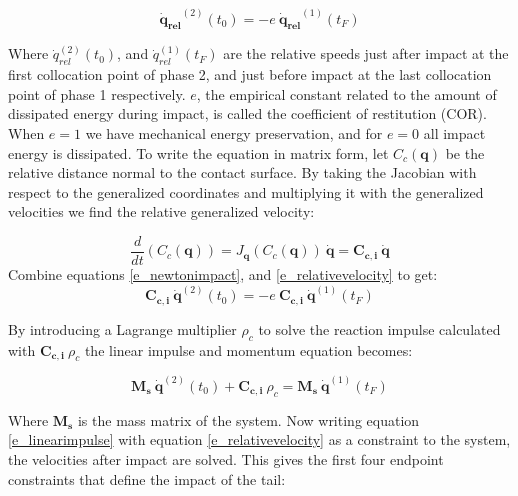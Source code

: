 \documentclass[default,iicol]{sn-jnl}
\begin{document}
\begin{equation}\label{e_newtonimpact}
    \mathbf{\dot q_{rel}}^{(2)}(t_0) = -e\ \mathbf{\dot q_{rel}}^{(1)}(t_F)
\end{equation}

Where $\dot q_{rel}^{(2)}(t_0)$, and $\dot q_{rel}^{(1)}(t_F)$ are the relative speeds just after impact at the first collocation point of phase 2, and just before impact at the last collocation point of phase 1 respectively.  $e$, the empirical constant related to the amount of dissipated energy during impact, is called the coefficient of restitution (COR). When $e=1$ we have mechanical energy preservation, and for $e=0$ all impact energy is dissipated. To write the equation in matrix form, let $C_c(\mathbf{q})$ be the relative distance normal to the contact surface. By taking the Jacobian with respect to the generalized coordinates and multiplying it with the generalized velocities we find the relative generalized velocity:

\begin{equation}\label{e_relativevelocity}
    \frac{d}{dt}\left(C_c(\mathbf{q})\right) = J_{\mathbf{q}}(C_c(\mathbf{q}))\ \mathbf{\dot q} = \mathbf{C_{c,i}}\  \mathbf{\dot q}
\end{equation}
Combine equations \ref{e_newtonimpact}, and \ref{e_relativevelocity} to get:
\begin{equation}
    \mathbf{C_{c,i}}\  \mathbf{\dot q}^{(2)}(t_0) = -e\ \mathbf{C_{c,i}}\ \mathbf{\dot q}^{(1)}(t_F)
\end{equation}

By introducing a Lagrange multiplier $\rho_c$ to solve the reaction impulse calculated with $\mathbf{C_{c,i}}\ \rho_c$ the linear impulse and momentum equation becomes:

\begin{equation}\label{e_linearimpulse}
    \mathbf{M_s}\ \mathbf{\dot q}^{(2)}(t_0) + \mathbf{C_{c,i}}\ \rho_c = \mathbf{M_s}\ \mathbf{\dot q}^{(1)}(t_F)
\end{equation}

Where $\mathbf{M_s}$ is the mass matrix of the system. Now writing equation \ref{e_linearimpulse} with equation \ref{e_relativevelocity} as a constraint to the system, the velocities after impact are solved. This gives the first four endpoint constraints that define the impact of the tail:
\end{document}
